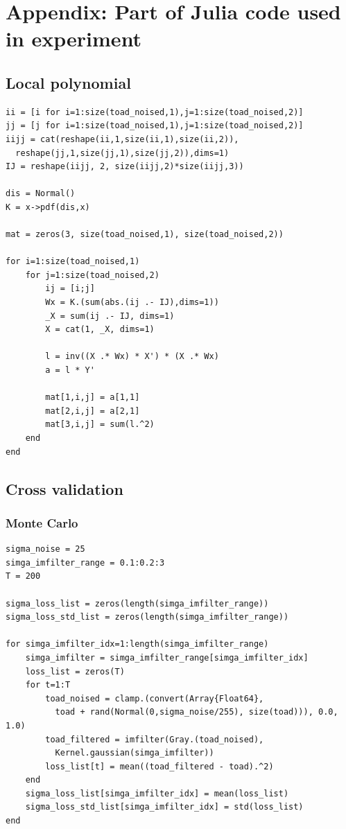 \documentclass{article}
\begin{document}
  

\newpage

\appendix

\section{Appendix: Part of Julia code used in experiment}



\subsection{Local polynomial}

\begin{lstlisting}
ii = [i for i=1:size(toad_noised,1),j=1:size(toad_noised,2)] 
jj = [j for i=1:size(toad_noised,1),j=1:size(toad_noised,2)] 
iijj = cat(reshape(ii,1,size(ii,1),size(ii,2)),
  reshape(jj,1,size(jj,1),size(jj,2)),dims=1)
IJ = reshape(iijj, 2, size(iijj,2)*size(iijj,3))

dis = Normal()
K = x->pdf(dis,x)

mat = zeros(3, size(toad_noised,1), size(toad_noised,2))

for i=1:size(toad_noised,1)
    for j=1:size(toad_noised,2)
        ij = [i;j]
        Wx = K.(sum(abs.(ij .- IJ),dims=1))
        _X = sum(ij .- IJ, dims=1)
        X = cat(1, _X, dims=1)

        l = inv((X .* Wx) * X') * (X .* Wx)
        a = l * Y'

        mat[1,i,j] = a[1,1]
        mat[2,i,j] = a[2,1]
        mat[3,i,j] = sum(l.^2)
    end
end
\end{lstlisting}

\subsection{Cross validation}

\subsubsection{Monte Carlo}

\begin{lstlisting}
sigma_noise = 25
simga_imfilter_range = 0.1:0.2:3
T = 200

sigma_loss_list = zeros(length(simga_imfilter_range))
sigma_loss_std_list = zeros(length(simga_imfilter_range))

for simga_imfilter_idx=1:length(simga_imfilter_range)
    simga_imfilter = simga_imfilter_range[simga_imfilter_idx]
    loss_list = zeros(T)
    for t=1:T
        toad_noised = clamp.(convert(Array{Float64}, 
          toad + rand(Normal(0,sigma_noise/255), size(toad))), 0.0, 1.0)
        toad_filtered = imfilter(Gray.(toad_noised), 
          Kernel.gaussian(simga_imfilter))
        loss_list[t] = mean((toad_filtered - toad).^2)
    end
    sigma_loss_list[simga_imfilter_idx] = mean(loss_list)
    sigma_loss_std_list[simga_imfilter_idx] = std(loss_list)
end
\end{lstlisting}
\end{document}
